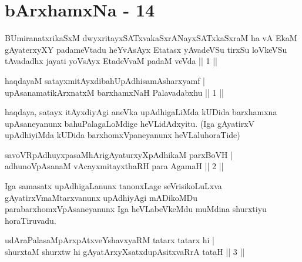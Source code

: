 \chapter{bArxhamxNa - 14}
\begin{kandikeshl}
BUmiranatxrikaSxM dwyxritayxSATxvakaSxrANayxSATxkaSxraM ha vA EkaM gAyaterxyXY padameVtadu heYvAsAyx Etatasx yAvadeVSu tirxSu loVkeVSu tAvadadhx jayati yoV\s sAyx EtadeVvaM padaM veVda || 1 ||
\end{kandikeshl}


\begin{shl}
haqdayaM satayxmitAyxdibahUpAdhisamAsharxyamf | \\
upAsanamatikArxnatxM barxhamxNaH Palavadabxhu \hfill ||  1 || 
\end{shl}

\begin{artha}
haqdaya, satayx itAyxdiyAgi aneVka upAdhigaLiMda kUDida barxhamxna 
upAsaneyanunx bahuPalagaLoMdige heVLidAdxyitu. (Iga gAyatirxV 
upAdhiyiMda kUDida barxhomxVpaneyanunx heVLalu\break horaTide)
\end{artha}

\begin{shl}
savoVRpAdhuyxpasaMhArigAyaturxyXpAdhikaM parxBoVH  | \\
adhunoVpAsanaM vAcayxmitayxthaRH para AgamaH \hfill ||  2 || 
\end{shl}

\begin{artha}
Iga samasatx upAdhigaLanunx tanonxLage seVrisikoLuLxva 
gAyatirxVmaMtarxvanunx upAdhiyAgi mADikoMDu parabarxhomxVpAsaneyanunx 
Iga heVLabeVkeMdu muMdina shurxtiyu horaTiruvadu.
\end{artha}


\begin{shl}
udAraPalasaMpArxpAtxveYshavxyaRM tatarx tatarx hi   | \\
shurxtaM shurxtw hi gAyatArxyXsatxdupAsitxvaRrA tataH \hfill ||  3 || 
\end{shl}

